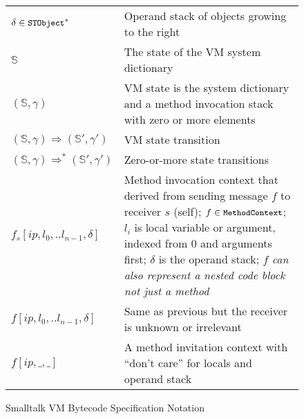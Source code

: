 \documentclass[11pt]{article}
\begin{document}
\begin{figure}
\begin{center}
\begin{tabular}{l p{8cm}}
$\delta \in \text{\tt\small STObject}^*$ &  Operand stack of objects growing to the right\\

$\mathbb{S}$ & The state of the VM system dictionary\\

$(\mathbb{S},\gamma)$ & VM state is the system dictionary and a method invocation stack with zero or more elements\\

$(\mathbb{S}, \gamma) \Rightarrow (\mathbb{S}', \gamma')$ & VM state transition\\

$(\mathbb{S}, \gamma) \Rightarrow^* (\mathbb{S}', \gamma')$ & Zero-or-more state transitions\\

$f_s[ip,l_0,..l_{n-1},\delta]$ & Method invocation context that derived from sending message $f$ to receiver $s$ (self);  $f \in \text{\tt\small MethodContext}$; $l_i$ is local variable or argument, indexed from 0 and arguments first; $\delta$ is the operand stack; $f$ {\em can also represent a nested code block not just a  method} \\

$f[ip,l_0,..l_{n-1},\delta]$ & Same as previous but the receiver is unknown or irrelevant \\

$f[ip,\_,\_]$ & A method invitation context with ``don't care'' for locals and operand stack\\

\end{tabular}
\end{center}
\vspace{-10pt}
\caption{\small Smalltalk VM Bytecode Specification Notation}
\label{acfg}
\end{figure} 

\def\arraystretch{1.25}

\end{document}
